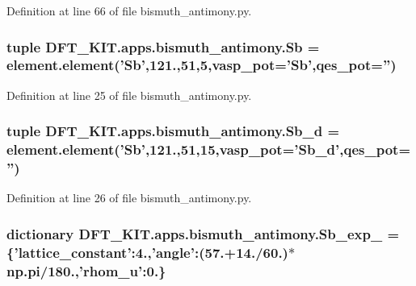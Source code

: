 Definition at line 66 of file bismuth\+\_\+antimony.\+py.

\hypertarget{namespace_d_f_t___k_i_t_1_1apps_1_1bismuth__antimony_a93eb1699becde1ccbaea30f9f2a83c48}{
\subsubsection[{Sb}]{\setlength{\rightskip}{0pt plus 5cm}tuple D\+F\+T\+\_\+\+K\+I\+T.\+apps.\+bismuth\+\_\+antimony.\+Sb = element.\+element('Sb',121.,51,5,vasp\+\_\+pot='Sb',qes\+\_\+pot='')}}\label{namespace_d_f_t___k_i_t_1_1apps_1_1bismuth__antimony_a93eb1699becde1ccbaea30f9f2a83c48}


Definition at line 25 of file bismuth\+\_\+antimony.\+py.

\hypertarget{namespace_d_f_t___k_i_t_1_1apps_1_1bismuth__antimony_a98b6587f573c187c59bed3eb7ba473ec}{
\subsubsection[{Sb\+\_\+d}]{\setlength{\rightskip}{0pt plus 5cm}tuple D\+F\+T\+\_\+\+K\+I\+T.\+apps.\+bismuth\+\_\+antimony.\+Sb\+\_\+d = element.\+element('{\bf Sb}',121.,51,15,vasp\+\_\+pot='Sb\+\_\+d',qes\+\_\+pot='')}}\label{namespace_d_f_t___k_i_t_1_1apps_1_1bismuth__antimony_a98b6587f573c187c59bed3eb7ba473ec}


Definition at line 26 of file bismuth\+\_\+antimony.\+py.

\hypertarget{namespace_d_f_t___k_i_t_1_1apps_1_1bismuth__antimony_aa1abaca0360ca74cc7aff767b2f8b339}{
\subsubsection[{Sb\+\_\+exp\+\_\+1}]{\setlength{\rightskip}{0pt plus 5cm}dictionary D\+F\+T\+\_\+\+K\+I\+T.\+apps.\+bismuth\+\_\+antimony.\+Sb\+\_\+exp\+\_ = \{'lattice\+\_\+constant'\+:4.,'angle'\+:(57.+14./60.)$\ast$np.\+pi/180.,'rhom\+\_\+u'\+:0.\}}}\label{namespace_d_f_t___k_i_t_1_1apps_1_1bismuth__antimony_aa1abaca0360ca74cc7aff767b2f8b339}


